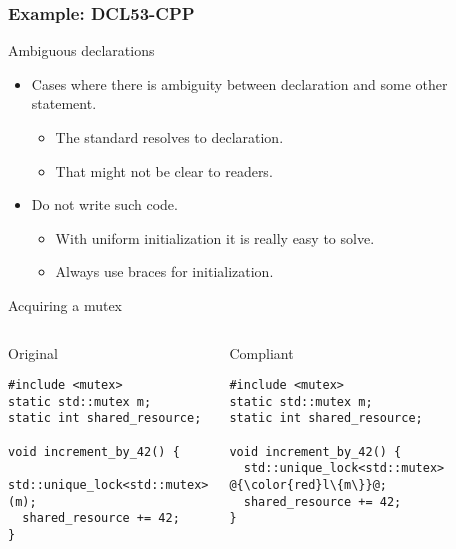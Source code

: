 \subsubsection{Example: DCL53-CPP}

\begin{frame}[t]{Ambiguous declarations}
\begin{itemize}
  \item Cases where there is ambiguity between declaration and some other statement.
    \begin{itemize}
      \item The standard resolves to declaration.
      \item That might not be clear to readers.
    \end{itemize}

  \vfill
  \item Do not write such code.
    \begin{itemize}
      \item With uniform initialization it is really easy to solve.
      \item Always use braces for initialization.
    \end{itemize}
\end{itemize}
\end{frame}

\begin{frame}[t,fragile]{Acquiring a mutex}
\begin{columns}

\begin{block}{Original}
\begin{lstlisting}
#include <mutex>
static std::mutex m;
static int shared_resource;

void increment_by_42() {
  std::unique_lock<std::mutex>(m);
  shared_resource += 42;
}
\end{lstlisting}
\end{block}

\pause
{}
\begin{block}{Compliant}
\begin{lstlisting}[escapechar=@]
#include <mutex>
static std::mutex m;
static int shared_resource;

void increment_by_42() {
  std::unique_lock<std::mutex> @{\color{red}l\{m\}}@;
  shared_resource += 42;
}
\end{lstlisting}
\end{block}

\end{columns}
\end{frame}


